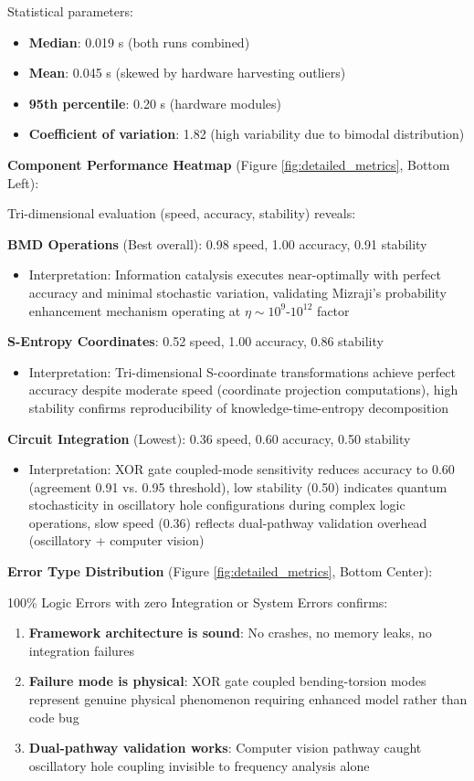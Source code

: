 \documentclass[11pt,a4paper]{article}
\begin{document}
Statistical parameters:
\begin{itemize}
\item \textbf{Median}: 0.019 s (both runs combined)
\item \textbf{Mean}: 0.045 s (skewed by hardware harvesting outliers)
\item \textbf{95th percentile}: 0.20 s (hardware modules)
\item \textbf{Coefficient of variation}: 1.82 (high variability due to bimodal distribution)
\end{itemize}

\textbf{Component Performance Heatmap} (Figure \ref{fig:detailed_metrics}, Bottom Left):

Tri-dimensional evaluation (speed, accuracy, stability) reveals:

\textbf{BMD Operations} (Best overall): 0.98 speed, 1.00 accuracy, 0.91 stability
\begin{itemize}
\item Interpretation: Information catalysis executes near-optimally with perfect accuracy and minimal stochastic variation, validating Mizraji's probability enhancement mechanism operating at $\eta \sim 10^9$-$10^{12}$ factor
\end{itemize}

\textbf{S-Entropy Coordinates}: 0.52 speed, 1.00 accuracy, 0.86 stability  
\begin{itemize}
\item Interpretation: Tri-dimensional S-coordinate transformations achieve perfect accuracy despite moderate speed (coordinate projection computations), high stability confirms reproducibility of knowledge-time-entropy decomposition
\end{itemize}

\textbf{Circuit Integration} (Lowest): 0.36 speed, 0.60 accuracy, 0.50 stability
\begin{itemize}
\item Interpretation: XOR gate coupled-mode sensitivity reduces accuracy to 0.60 (agreement 0.91 vs. 0.95 threshold), low stability (0.50) indicates quantum stochasticity in oscillatory hole configurations during complex logic operations, slow speed (0.36) reflects dual-pathway validation overhead (oscillatory + computer vision)
\end{itemize}

\textbf{Error Type Distribution} (Figure \ref{fig:detailed_metrics}, Bottom Center):

100\% Logic Errors with zero Integration or System Errors confirms:
\begin{enumerate}
\item \textbf{Framework architecture is sound}: No crashes, no memory leaks, no integration failures
\item \textbf{Failure mode is physical}: XOR gate coupled bending-torsion modes represent genuine physical phenomenon requiring enhanced model rather than code bug
\item \textbf{Dual-pathway validation works}: Computer vision pathway caught oscillatory hole coupling invisible to frequency analysis alone
\end{enumerate}
\end{document}
